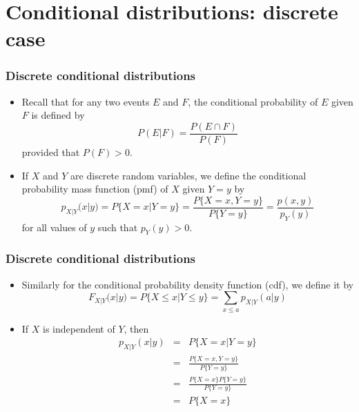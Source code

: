 \documentclass[slidestop,compress,mathserif]{beamer}
\begin{document}



\section{Conditional distributions: discrete case}



\begin{frame}\frametitle{Discrete conditional distributions}
\begin{itemize}
\item Recall that for any two events $E$ and $F$, the conditional probability of $E$ given $F$ is defined by
$$P(E|F) = \frac{P(E\cap F)}{P(F)}$$
provided that $P(F) > 0$.
\vspace{4mm}
\pause
\item If $X$ and $Y$ are discrete random variables, we define the conditional probability mass function (pmf) of $X$ given $Y=y$ by
$$p_{X|Y}(x|y) = P\{X = x|Y = y\} = \frac{P\{X = x, Y = y\}}{P\{Y = y\}} = \frac{p(x, y)}{p_Y(y)}$$
for all values of $y$ such that $p_Y(y) > 0$.
\end{itemize}
\end{frame}


\begin{frame}\frametitle{Discrete conditional distributions}
\begin{itemize}
\item Similarly for the conditional probability density function (cdf), we define it by
$$F_{X|Y}(x|y) = P\{X \leq x|Y \leq y\} = \sum_{x \leq a}p_{X|Y}(a|y)$$
\vspace{4mm}
\item If $X$ is independent of $Y$, then
\begin{eqnarray*}
p_{X|Y}(x|y) &=& P\{X = x|Y = y\}\\
&=&\frac{P\{X = x, Y = y\}}{P\{Y = y\}} \\
&=&\frac{P\{X = x\}P\{Y = y\}}{P\{Y = y\}}\\
&=&P\{X = x\}
\end{eqnarray*}
\end{itemize}
\end{frame}
\end{document}
